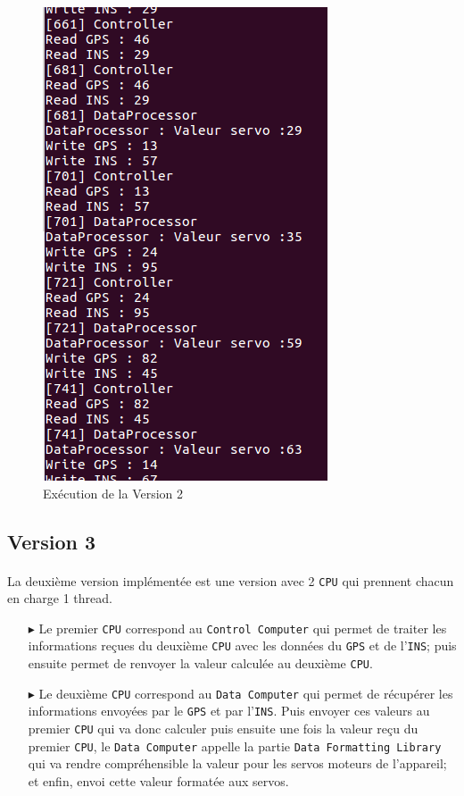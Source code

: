 \documentclass[a4paper,12pt]{report}
\begin{document}
		\begin{figure}[H]
				\centering
					\includegraphics[scale=0.5]{ocarina.png}
					\caption{Exécution de la Version 2}
				\label{ocarina}
			\end{figure}
	
		\subsection{Version 3}
			\paragraph*{}
			La deuxième version implémentée est une version avec 2 \texttt{CPU} qui prennent chacun en charge 1 thread.
			
			\begin{itemize}
				\item[$\blacktriangleright$] Le premier \texttt{CPU} correspond au \texttt{Control Computer} qui permet de traiter les informations reçues du deuxième \texttt{CPU} avec les données du \texttt{GPS} et de l'\texttt{INS}; puis ensuite permet de renvoyer la valeur calculée au deuxième \texttt{CPU}.
			
				\item[$\blacktriangleright$] Le deuxième \texttt{CPU} correspond au \texttt{Data Computer} qui permet de récupérer les informations envoyées par le \texttt{GPS} et par l'\texttt{INS}. Puis envoyer ces valeurs au premier \texttt{CPU} qui va donc calculer puis ensuite une fois la valeur reçu du premier \texttt{CPU}, le \texttt{Data Computer} appelle la partie \texttt{Data Formatting Library} qui va rendre compréhensible la valeur pour les servos moteurs de l'appareil; et enfin, envoi cette valeur formatée aux servos.
			\end{itemize}
			
\end{document}

